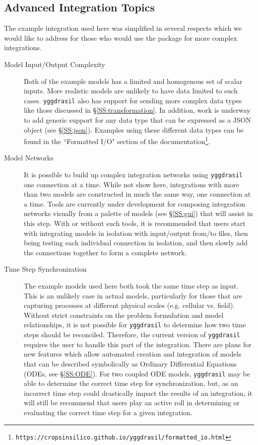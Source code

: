 \documentclass[journal]{IEEEtran}
\newcommand{\pkg}{{\tt yggdrasil}{}}
\newcommand{\pkglink}{yggdrasil}
\begin{document}
\subsection{Advanced Integration Topics}
%
The example integration used here was simplified in several respects which we would like to address for those who would use the package for more complex integrations.
\begin{description}
\item[Model Input/Output Complexity] Both of the example models has a limited and homogenous set of scalar inputs. More realistic models are unlikely to have data limited to such cases. {\pkg} also has support for sending more complex data types like those discussed in \S\ref{SS:transformation}. In addition, work is underway to add generic support for any data type that can be expressed as a JSON object (see \S\ref{SS:json}). Examples using these different data types can be found in the ``Formatted I/O" section of the documentation\footnote{{\tt https://cropsinsilico.github.io/\pkglink/formatted\_io.html}}.
\item[Model Networks] It is possible to build up complex integration networks using {\pkg} one connection at a time. While not show here, integrations with more than two models are constructed in much the same way, one connection at a time. Tools are currently under development for composing integration networks visually from a palette of models (see \S\ref{SS:gui}) that will assist in this step. With or without such tools, it is recommended that users start with integrating models in isolation with input/output from/to files, then being testing each individual connection in isolation, and then slowly add the connections together to form a complete network.
\item[Time Step Synchronization] The example models used here both took the same time step as input. This is an unlikely case in actual models, particularly for those that are capturing processes at different physical scales (e.g. cellular vs. field). Without strict constraints on the problem formulation and model relationships, it is not possible for {\pkg} to determine how two time steps should be reconciled. Therefore, the current version of {\pkg} requires the user to handle this part of the integration. There are plans for new features which allow automated creation and integration of models that can be described symbolically as Ordinary Differential Equations (ODEs, see \S\ref{SS:ODE}). For two coupled ODE models, {\pkg} may be able to determine the correct time step for synchronization, but, as an incorrect time step could drastically impact the results of an integration, it will still be recommend that users play an active roll in determining or evaluating the correct time step for a given integration.

\end{description}
\end{document}
